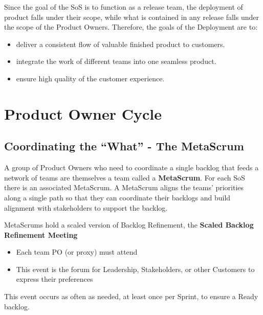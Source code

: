 \documentclass[12pt,a4paper,parskip=full]{scrartcl}
\begin{document}
Since the goal of the SoS is to function as a release team, the deployment
of product falls under their scope, while what is contained in any release
falls under the scope of the Product Owners. Therefore, the goals of the
Deployment are to:
\begin{itemize}
\item deliver a consistent flow of valuable finished product to customers.
\item integrate the work of different teams into one seamless product.
\item ensure high quality of the customer experience.
\end{itemize}

\section{Product Owner Cycle}
\subsection{Coordinating the ``What'' - The MetaScrum}
A group of Product Owners who need to coordinate a single backlog that
feeds a network of teams are themselves a team called a \textbf{MetaScrum}.
For each SoS there is an associated MetaScrum. A MetaScrum aligns the
teams' priorities along a single path so that they can coordinate their
backlogs and build alignment with stakeholders to support the backlog.

MetaScrums hold a scaled version of Backlog Refinement, the \textbf{Scaled Backlog Refinement Meeting} 
\begin{itemize}
\item Each team PO (or proxy) must attend
\item This event is the forum for Leadership, Stakeholders, or other
Customers to express their preferences
\end{itemize}
This event occurs as often as needed, at least once per Sprint, to ensure a
Ready backlog. 
\end{document}
